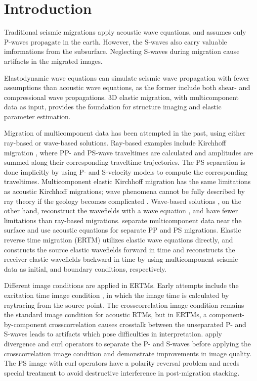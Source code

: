 \documentclass[manuscript,ulem,graphix,revised]{geophysics}
\begin{document}
\section{Introduction}
Traditional seismic migrations apply acoustic wave equations, and assumes only P-waves propagate in the earth. However, the S-waves also carry valuable imformations from the subsurface. Neglecting S-waves during migration cause artifacts in the migrated images. 

Elastodynamic wave equations can simulate seismic wave propagation with fewer assumptions than acoustic wave equations, as the former include both shear- and compressional wave propagations. 3D elastic migration, with multicomponent data as input, provides the foundation for structure imaging and elastic parameter estimation.

Migration of multicomponent data has been attempted in the past, using either ray-based or wave-based solutions. Ray-based examples include Kirchhoff migration \citep{kuo84, dai86, hokstad00}, where PP- and PS-wave traveltimes are calculated and amplitudes are summed along their corresponding traveltime trajectories. The PS separation is done implicitly by using P- and S-velocity models to compute the corresponding traveltimes. Multicomponent elastic Kirchhoff migration has the same limitations as acoustic Kirchhoff migrations; wave phenomena cannot be fully described by ray theory if the geology becomes complicated \citep{gray01}. Wave-based solutions \citep{chang86,chang94,whitmore95}, on the other hand, reconstruct the wavefields with a wave equation \citep{wapenaar90}, and have fewer limitations than ray-based migrations. \citet{sun01} separate multicomponent data near the surface and use acoustic equations for separate PP and PS migrations. Elastic reverse time migration (ERTM) utilizes elastic wave equations directly, and constructs the source elastic wavefields forward in time and reconstructs the receiver elastic wavefields backward in time by using multicomponent seismic data as initial, and boundary conditions, respectively.

Different image conditions are applied in ERTMs. Early attempts include the excitation time image condition \citep{chang86}, in which the image time is calculated by raytracing from the source point. The crosscorrelation image condition \citep{claerbout85} remains the standard image condition for acoustic RTMs, but in ERTMs, a component-by-component crosscorrelation causes crosstalk between the unseparated P- and S-waves leads to artifacts which pose difficulties in interpretation. \citet{yan08} apply divergence and curl operators to separate the P- and S-waves before applying the crosscorrelation image condition and demonstrate improvements in image quality. The PS image with curl operators have a polarity reversal problem and needs special treatment \citep{du12} to avoid destructive interference in post-migration stacking.
\end{document}
